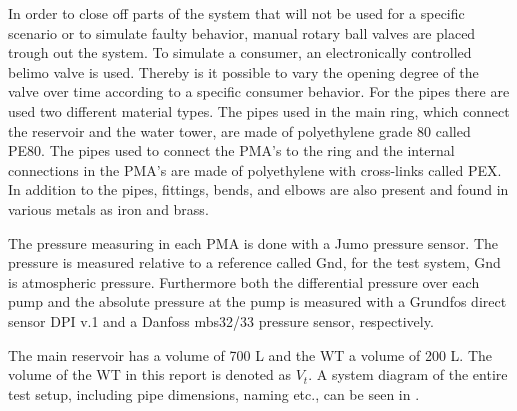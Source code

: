 In order to close off parts of the system that will not be used for a specific scenario or to simulate faulty behavior, manual rotary ball valves are placed trough out the system. 
To simulate a consumer, an electronically controlled belimo valve is used. Thereby is it possible to vary the opening degree of the valve over time according to a specific consumer behavior. 
For the pipes there are used two different material types. The pipes used in the main ring, which connect the reservoir and the water tower, are made of polyethylene grade 80 called PE80\cite{PE100}.
 The pipes used to connect the PMA's to the ring and the internal connections in the PMA's are made of polyethylene with cross-links called PEX. In addition to the pipes, fittings, bends, and elbows are also present and found in various metals as iron and brass.     

The pressure measuring in each PMA is done with a Jumo pressure sensor. The pressure is measured relative to a reference called Gnd, for the test system, Gnd is atmospheric pressure. Furthermore both the differential pressure over each pump and the absolute pressure at the pump is measured with a Grundfos direct sensor DPI v.1 and a Danfoss mbs32/33 pressure sensor, respectively.    

The main reservoir has a volume of 700 L and the WT a volume of 200 L. The volume of the WT in this report is denoted as $V_t$. A system diagram of the entire test setup, including pipe dimensions, naming etc., can be seen in .
